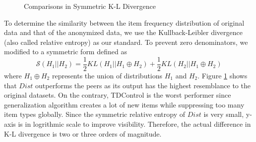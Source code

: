 
\begin{figure}[tb]
\centering
{}
\caption{Comparisons in Symmetric K-L Divergence}
\label{fig:entropy}
\end{figure}

To determine the similarity between the item frequency distribution
of original data and that of the anonymized data,
we use the Kullback-Leibler
divergence (also called relative entropy) as our standard.
To prevent zero denominators, we modified 
to a symmetric form \cite{Fisher:2008:DSF} defined as
\[\mathcal{S}(H_1||H_2)=\frac{1}{2}KL( H_1||H_1 \oplus H_2)+\frac{1}{2} KL( H_2||H_1 \oplus H_2)\]
where  $H_1 \oplus H_2$ represents the union of distributions $H_1$ and $H_2$.
Figure \ref{fig:entropy} shows that $Dist$ outperforms the peers
 as its output has the highest resemblance
to the original datasets.
On the contrary, TDControl is the worst performer
since generalization algorithm creates a lot of new items while
suppressing too many item types globally.
Since the symmetric relative entropy of $Dist$ is very small, y-axis is
in logrithmic scale to improve visibility. Therefore, the actual difference
in K-L divergence is two or three orders of magnitude.

